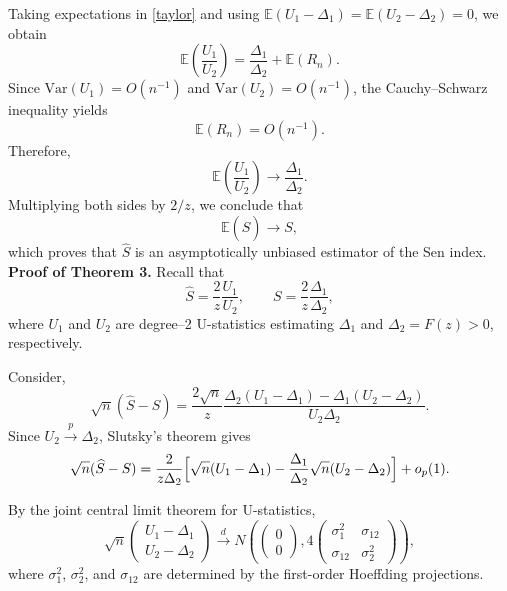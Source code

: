 \documentclass[11pt]{article}
\begin{document}
Taking expectations in \eqref{taylor} and using $\mathbb{E}(U_1-\Delta_1)=\mathbb{E}(U_2-\Delta_2)=0$, we obtain
$$
\mathbb{E}\!\left(\frac{U_1}{U_2}\right)=\frac{\Delta_1}{\Delta_2}+\mathbb{E}(R_n).
$$
Since
$\mathrm{Var}(U_1)=O(n^{-1})$ and $\mathrm{Var}(U_2)=O(n^{-1})$, the Cauchy--Schwarz inequality yields $$\mathbb{E}(R_n)=O(n^{-1}).$$
Therefore,
$$
\mathbb{E}\!\left(\frac{U_1}{U_2}\right)
\longrightarrow \frac{\Delta_1}{\Delta_2}.
$$
Multiplying both sides by $2/z$, we conclude that
$$
\mathbb{E}(\widehat{S}) \longrightarrow S,
$$
which proves that $\widehat{S}$ is an asymptotically unbiased estimator of the Sen index.\\

\noindent
{\bf Proof of Theorem 3.}
Recall that
$$
\widehat S=\frac{2}{z}\frac{U_1}{U_2},
\qquad
S=\frac{2}{z}\frac{\Delta_1}{\Delta_2},
$$
where $U_1$ and $U_2$ are degree--2 U-statistics estimating $\Delta_1$ and
$\Delta_2=F(z)>0$, respectively.

Consider,
$$
\sqrt n(\widehat S-S)
=
\frac{2\sqrt n}{z}
\frac{\Delta_2(U_1-\Delta_1)-\Delta_1(U_2-\Delta_2)}{U_2\Delta_2}.
$$
Since $U_2\xrightarrow{p}\Delta_2$, Slutsky’s theorem gives
$$
\sqrt n(\widehat S-S)
=
\frac{2}{z\Delta_2}
\Bigl[
\sqrt n(U_1-\Delta_1)
-\frac{\Delta_1}{\Delta_2}\sqrt n(U_2-\Delta_2)
\Bigr]
+o_p(1).
$$

By the joint central limit theorem for U-statistics,
$$
\sqrt n
\begin{pmatrix}
U_1-\Delta_1\\
U_2-\Delta_2
\end{pmatrix}
\xrightarrow{d}
N\!\left(
\begin{pmatrix}0\\0\end{pmatrix},
4
\begin{pmatrix}
\sigma_1^2 & \sigma_{12}\\
\sigma_{12} & \sigma_2^2
\end{pmatrix}
\right),
$$
where $\sigma_1^2$, $\sigma_2^2$, and $\sigma_{12}$ are determined by the
first-order Hoeffding projections.
\end{document}
